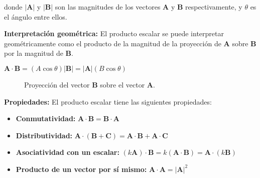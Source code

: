 \documentclass{article}
\begin{document}
donde $|\mathbf{A}|$ y $|\mathbf{B}|$ son las magnitudes de los vectores $\mathbf{A}$ y $\mathbf{B}$ respectivamente, y $\theta$ es el ángulo entre ellos.

\textbf{Interpretación geométrica:} El producto escalar se puede interpretar geométricamente como el producto de la magnitud de la proyección de $\mathbf{A}$ sobre $\mathbf{B}$ por la magnitud de $\mathbf{B}$.

$\mathbf{A} \cdot \mathbf{B} = (A \cos \theta) |\mathbf{B}| = |\mathbf{A}| (B \cos \theta)$

\begin{figure}[H]
\centering
{}
\caption{Proyección del vector $\mathbf{B}$ sobre el vector $\mathbf{A}$.}
\label{fig:proyeccion_vectorial_B_sobre_A}
\end{figure}

\textbf{Propiedades:} El producto escalar tiene las siguientes propiedades:

\begin{itemize}
\item[\textbullet] \textbf{Conmutatividad:} $\mathbf{A} \cdot \mathbf{B} = \mathbf{B} \cdot \mathbf{A}$
\item[\textbullet] \textbf{Distributividad:} $\mathbf{A} \cdot (\mathbf{B} + \mathbf{C}) = \mathbf{A} \cdot \mathbf{B} + \mathbf{A} \cdot \mathbf{C}$
\item[\textbullet] \textbf{Asociatividad con un escalar:} $(k\mathbf{A}) \cdot \mathbf{B} = k(\mathbf{A} \cdot \mathbf{B}) = \mathbf{A} \cdot (k\mathbf{B})$
\item[\textbullet] \textbf{Producto de un vector por sí mismo:} $\mathbf{A} \cdot \mathbf{A} = |\mathbf{A}|^2$
\end{itemize}
\end{document}
